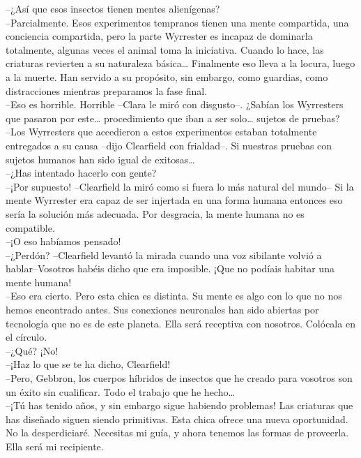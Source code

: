 --¿Así que esos insectos tienen mentes alienígenas?\\
--Parcialmente. Esos experimentos tempranos tienen una mente compartida,
una conciencia compartida, pero la parte Wyrrester es incapaz de
dominarla totalmente, algunas veces el animal toma la iniciativa. Cuando
lo hace, las criaturas revierten a su naturaleza básica\ldots{}
Finalmente eso lleva a la locura, luego a la muerte. Han servido a su
propósito, sin embargo, como guardias, como distracciones mientras
preparamos la fase final.\\
--Eso es horrible. Horrible --Clara le miró con disgusto--. ¿Sabían los
Wyrresters que pasaron por este\ldots{} procedimiento que iban a ser
solo\ldots{} sujetos de pruebas?\\
--Los Wyrresters que accedieron a estos experimentos estaban totalmente
entregados a su causa --dijo Clearfield con frialdad--. Si nuestras
pruebas con sujetos humanos han sido igual de exitosas\ldots{}\\
--¿Has intentado hacerlo con gente?\\
--¡Por supuesto! --Clearfield la miró como si fuera lo más natural del
mundo-- Si la mente Wyrrester era capaz de ser injertada en una forma
humana entonces eso sería la solución más adecuada. Por desgracia, la
mente humana no es compatible.\\
--¡O eso habíamos pensado!\\
--¿Perdón? --Clearfield levantó la mirada cuando una voz sibilante
volvió a hablar--Vosotros habéis dicho que era imposible. ¡Que no
podíais habitar una mente humana!\\
--Eso era cierto. Pero esta chica es distinta. Su mente es algo con lo
que no nos hemos encontrado antes. Sus conexiones neuronales han sido
abiertas por tecnología que no es de este planeta. Ella será receptiva
con nosotros. Colócala en el círculo.\\
--¿Qué? ¡No!\\
--¡Haz lo que se te ha dicho, Clearfield!\\
--Pero, Gebbron, los cuerpos híbridos de insectos que he creado para
vosotros son un éxito sin cualificar. Todo el trabajo que he
hecho\ldots{}\\
--¡Tú has tenido años, y sin embargo sigue habiendo problemas! Las
criaturas que has diseñado siguen siendo primitivas. Esta chica ofrece
una nueva oportunidad. No la desperdiciaré. Necesitas mi guía, y ahora
tenemos las formas de proveerla. Ella será mi recipiente.\\
